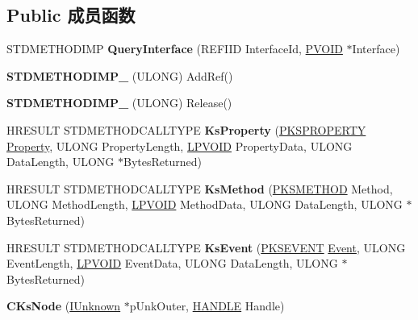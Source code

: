 \subsection*{Public 成员函数}
\begin{DoxyCompactItemize}
\item 
\mbox{\label{class_c_ks_node_af936bf30f9966fa767659ff182852c03}} 
S\+T\+D\+M\+E\+T\+H\+O\+D\+I\+MP {\bfseries Query\+Interface} (R\+E\+F\+I\+ID Interface\+Id, \hyperlink{interfacevoid}{P\+V\+O\+ID} $\ast$Interface)
\item 
\mbox{\label{class_c_ks_node_a98e3c6f25f4c79e3c1e48ef6f79211c4}} 
{\bfseries S\+T\+D\+M\+E\+T\+H\+O\+D\+I\+M\+P\+\_\+} (U\+L\+O\+NG) Add\+Ref()
\item 
\mbox{\label{class_c_ks_node_a211e13d0d4a943a5ef6d95ad67b6aac7}} 
{\bfseries S\+T\+D\+M\+E\+T\+H\+O\+D\+I\+M\+P\+\_\+} (U\+L\+O\+NG) Release()
\item 
\mbox{\label{class_c_ks_node_a8ce3681235cc701bdcc253083a387713}} 
H\+R\+E\+S\+U\+LT S\+T\+D\+M\+E\+T\+H\+O\+D\+C\+A\+L\+L\+T\+Y\+PE {\bfseries Ks\+Property} (\hyperlink{struct_k_s_i_d_e_n_t_i_f_i_e_r}{P\+K\+S\+P\+R\+O\+P\+E\+R\+TY} \hyperlink{struct_property}{Property}, U\+L\+O\+NG Property\+Length, \hyperlink{interfacevoid}{L\+P\+V\+O\+ID} Property\+Data, U\+L\+O\+NG Data\+Length, U\+L\+O\+NG $\ast$Bytes\+Returned)
\item 
\mbox{\label{class_c_ks_node_ab5bcfdf9293f0439ff7f11d4ea15da30}} 
H\+R\+E\+S\+U\+LT S\+T\+D\+M\+E\+T\+H\+O\+D\+C\+A\+L\+L\+T\+Y\+PE {\bfseries Ks\+Method} (\hyperlink{struct_k_s_i_d_e_n_t_i_f_i_e_r}{P\+K\+S\+M\+E\+T\+H\+OD} Method, U\+L\+O\+NG Method\+Length, \hyperlink{interfacevoid}{L\+P\+V\+O\+ID} Method\+Data, U\+L\+O\+NG Data\+Length, U\+L\+O\+NG $\ast$Bytes\+Returned)
\item 
\mbox{\label{class_c_ks_node_acbba46f4a6adf148328d75518235d8a9}} 
H\+R\+E\+S\+U\+LT S\+T\+D\+M\+E\+T\+H\+O\+D\+C\+A\+L\+L\+T\+Y\+PE {\bfseries Ks\+Event} (\hyperlink{struct_k_s_i_d_e_n_t_i_f_i_e_r}{P\+K\+S\+E\+V\+E\+NT} \hyperlink{struct_event}{Event}, U\+L\+O\+NG Event\+Length, \hyperlink{interfacevoid}{L\+P\+V\+O\+ID} Event\+Data, U\+L\+O\+NG Data\+Length, U\+L\+O\+NG $\ast$Bytes\+Returned)
\item 
\mbox{\label{class_c_ks_node_a3906537c10c77780a859e260c1c8a806}} 
{\bfseries C\+Ks\+Node} (\hyperlink{interface_i_unknown}{I\+Unknown} $\ast$p\+Unk\+Outer, \hyperlink{interfacevoid}{H\+A\+N\+D\+LE} Handle)
\end{DoxyCompactItemize}
